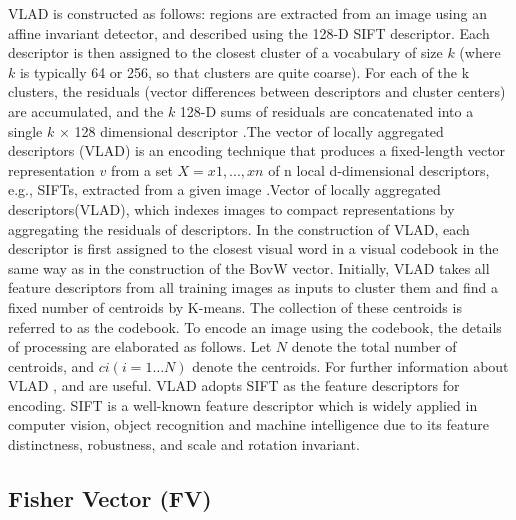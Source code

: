 \documentclass[12pt]{article}
\numberwithin{equation}{section}
\numberwithin{table}{section}
\numberwithin{figure}{section}
\begin{document}
VLAD is constructed as follows: regions are extracted from an image using an affine invariant detector, and described using the 128-D SIFT descriptor. Each descriptor is then assigned to the closest cluster of a vocabulary of size $k$ (where $k$ is typically 64 or 256, so that clusters are quite coarse). For each of the k clusters, the residuals (vector differences between descriptors and cluster centers) are accumulated, and the $k$ 128-D sums of residuals are concatenated into a single $k$ × 128 dimensional descriptor \cite{Arandjelovic2013}.The vector of locally aggregated descriptors (VLAD) is an encoding technique that produces a fixed-length vector representation $v$ from a set $X = {x1, . . . , xn}$ of n local d-dimensional descriptors, e.g., SIFTs, extracted from a given image \cite{Delhumeau2013}.Vector of locally aggregated descriptors(VLAD), which indexes images to compact representations by aggregating the residuals of descriptors. In the construction of VLAD, each descriptor is first assigned to the closest visual word in a visual codebook in the same way as in the construction of the BovW vector\cite{Uchida2013}.
Initially, VLAD takes all feature descriptors from all training images as inputs to cluster them and find a fixed number of centroids by K-means. The collection of these centroids is referred to as the codebook. To encode an image using the codebook, the details of processing are elaborated as follows. Let $N$ denote the total number of centroids, and $ci(i=1…N)$ denote the centroids. For further information about VLAD \cite{Arandjelovic2013}, \cite{Jegou2010} and \cite{Singh2012} are useful. VLAD adopts SIFT as the feature descriptors for encoding. SIFT is a well-known feature descriptor which is widely applied in computer vision, object recognition and machine intelligence due to its feature distinctness, robustness, and scale and rotation invariant\cite{Singh2012}.



\subsection{Fisher Vector (FV)} \label{fv}
\end{document}
